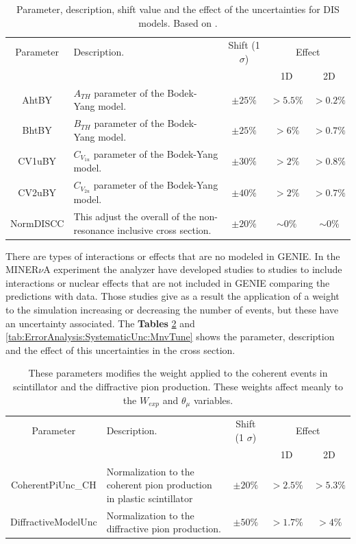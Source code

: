 \begin{table}[!htb]
    \centering
    \begin{tabular}{c|p{2.1in}|c|c|c}
        \hline 
        Parameter & Description.  & Shift (1 $\sigma$) & \multicolumn{2}{c}{Effect} \\
         & & & 1D & 2D \\
        \hline  
        AhtBY & $A_{TH}$ parameter of the Bodek-Yang model. & $\pm25\%$ & $>5.5\%$ & $>0.2\%$\\ \hline
        BhtBY & $B_{TH}$ parameter of the Bodek-Yang model. & $\pm25\%$ & $>6\%$ & $>0.7\%$ \\ \hline
        CV1uBY & $C_{V_{1u}}$ parameter of the Bodek-Yang model. & $\pm30\%$ & $>2\%$ & $>0.8\%$ \\ \hline
        CV2uBY & $C_{V_{2u}}$ parameter of the Bodek-Yang model. & $\pm40\%$ & $>2\%$ & $>0.7\%$ \\ \hline
        NormDISCC & This adjust the overall of the non-resonance inclusive cross section. & $\pm20\%$ & $\sim0\%$ & $\sim0\%$ \\ \hline 
    \end{tabular}
    \caption{Parameter, description, shift value and the effect of the uncertainties for DIS models. Based on \cite{GENIEUnc}.}
    \label{tab:ErrorAnalysis:SystematicUnc:GenieDISmodels}
\end{table}

There are types of interactions or effects that are no modeled in GENIE. In the MINER$\nu$A experiment the analyzer have developed studies to studies to include interactions or nuclear effects that are not included in GENIE comparing the predictions with data. Those studies give as a result the application of a weight to the simulation increasing or decreasing the number of events, but these have an uncertainty associated. The \textbf{Tables} \ref{tab:ErrorAnalysis:SystematicUnc:CoherentandDifractive} and \ref{tab:ErrorAnalysis:SystematicUnc:MnvTune} shows the parameter, description and the effect of this uncertainties in the cross section.

\begin{table}[!htb]
    \centering
    \begin{tabular}{c|p{2in}|c|c|c}
        \hline 
        Parameter & Description.  & Shift (1 $\sigma$) & \multicolumn{2}{c}{Effect} \\
         & & & 1D & 2D \\
        \hline  
        CoherentPiUnc\_CH & Normalization to the coherent pion production in plastic scintillator & $\pm20\%$ & $>2.5\%$ & $>5.3\%$\\ \hline
        DiffractiveModelUnc & Normalization to the diffractive pion production. & $\pm50\%$ & $>1.7\%$ & $>4\%$ \\ \hline 
    \end{tabular}
    \caption{These parameters modifies the weight applied to the coherent events in scintillator and the diffractive pion production. These weights affect meanly to the $W_{exp}$ and $\theta_\mu$ variables.}
    \label{tab:ErrorAnalysis:SystematicUnc:CoherentandDifractive}
\end{table}

